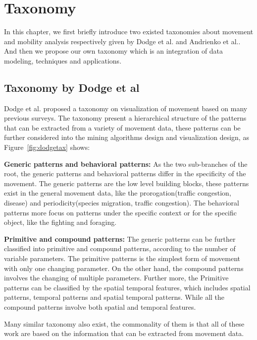 \chapter{Taxonomy}
\label{chap:intro}

In this chapter, we first briefly introduce two existed taxonomies about movement and mobility analysis respectively given by Dodge et al.\cite{dodge2008towards} and Andrienko et al.\cite{andrienko2017visual}. And then we propose our own taxonomy which is an integration of data modeling, techniques and applications. 


\section{Taxonomy by Dodge et al}

Dodge et al.\cite{dodge2008towards} proposed a taxonomy on visualization of movement based on many previous surveys. The taxonomy present a hierarchical structure of the patterns that can be extracted from a variety of movement data, these patterns can be further considered into the mining algorithms design and visualization design, as Figure~\ref{fig:dodgetax} shows:

\textbf{Generic patterns and behavioral patterns:} As the two sub-branches of the root, the generic patterns and behavioral patterns differ in the specificity of the movement. The generic patterns are the low level building blocks, these patterns exist in the general movement data, like the prorogation(traffic congestion, disease) and periodicity(species migration, traffic congestion). The behavioral patterns more focus on patterns under the specific context or for the specific object, like the fighting and foraging. 

\textbf{Primitive and compound patterns:} The generic patterns can be further classified into primitive and compound patterns, according to the number of variable parameters. The primitive patterns is the simplest form of movement with only one changing parameter. On the other hand, the compound patterns involves the changing of multiple parameters. Further more, the Primitive patterns can be classified by the spatial temporal features, which includes spatial patterns, temporal patterns and spatial temporal patterns. While all the compound patterns involve both spatial and temporal features.

Many similar taxonomy also exist, the commonality of them is that all of these work are based on the information that can be extracted from movement data. 

